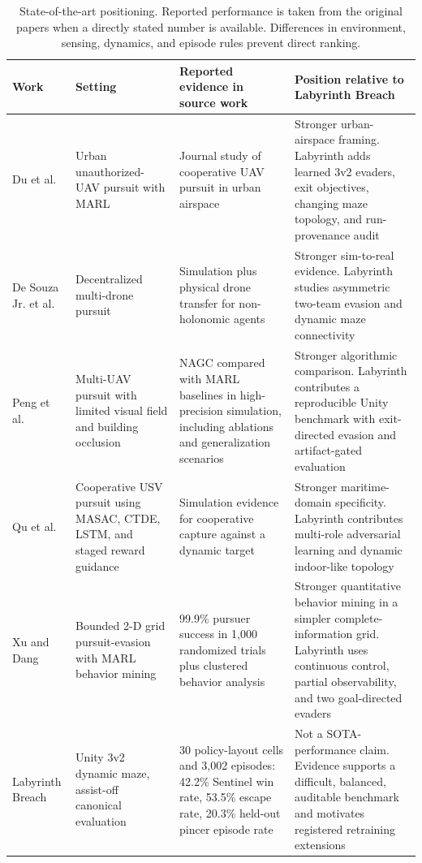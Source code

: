 \documentclass[journal]{IEEEtran}
\begin{document}
\begin{table}[t]
\centering
\caption{State-of-the-art positioning. Reported performance is taken from the original papers when a directly stated number is available. Differences in environment, sensing, dynamics, and episode rules prevent direct ranking.}
\label{tab:sota_positioning}
\scriptsize
\setlength{\tabcolsep}{4pt}
\begin{tabular}{p{2.55cm}p{3.0cm}p{4.25cm}p{4.65cm}}
\toprule
Work & Setting & Reported evidence in source work & Position relative to Labyrinth Breach \\
\midrule
Du et al. \cite{du2021uav} & Urban unauthorized-UAV pursuit with MARL & Journal study of cooperative UAV pursuit in urban airspace & Stronger urban-airspace framing. Labyrinth adds learned 3v2 evaders, exit objectives, changing maze topology, and run-provenance audit \\
De Souza Jr. et al. \cite{desouza2020} & Decentralized multi-drone pursuit & Simulation plus physical drone transfer for non-holonomic agents & Stronger sim-to-real evidence. Labyrinth studies asymmetric two-team evasion and dynamic maze connectivity \\
Peng et al. \cite{peng2025limited} & Multi-UAV pursuit with limited visual field and building occlusion & NAGC compared with MARL baselines in high-precision simulation, including ablations and generalization scenarios & Stronger algorithmic comparison. Labyrinth contributes a reproducible Unity benchmark with exit-directed evasion and artifact-gated evaluation \\
Qu et al. \cite{qu2026usv} & Cooperative USV pursuit using MASAC, CTDE, LSTM, and staged reward guidance & Simulation evidence for cooperative capture against a dynamic target & Stronger maritime-domain specificity. Labyrinth contributes multi-role adversarial learning and dynamic indoor-like topology \\
Xu and Dang \cite{xu2025emergent} & Bounded 2-D grid pursuit-evasion with MARL behavior mining & 99.9\% pursuer success in 1,000 randomized trials plus clustered behavior analysis & Stronger quantitative behavior mining in a simpler complete-information grid. Labyrinth uses continuous control, partial observability, and two goal-directed evaders \\
Labyrinth Breach & Unity 3v2 dynamic maze, assist-off canonical evaluation & 30 policy-layout cells and 3,002 episodes: 42.2\% Sentinel win rate, 53.5\% escape rate, 20.3\% held-out pincer episode rate & Not a SOTA-performance claim. Evidence supports a difficult, balanced, auditable benchmark and motivates registered retraining extensions \\
\bottomrule
\end{tabular}
\end{table}
\end{document}
